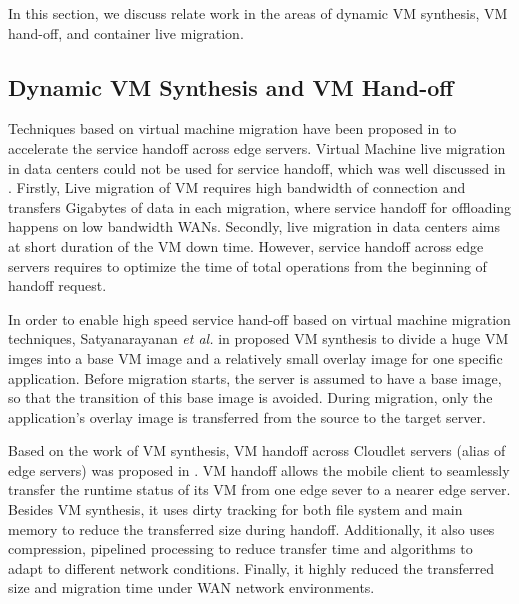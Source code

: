 In this section, we discuss relate work in the areas of dynamic VM synthesis, VM hand-off, and container live migration.

\subsection{Dynamic VM Synthesis and VM Hand-off} \label{motivation:vmhandoff}

Techniques based on virtual machine migration have been proposed in  \cite{ha2015vmhandoff} \cite{satya2009case} to accelerate the service handoff across edge servers. Virtual Machine live migration in data centers could not be used for service handoff, which was well discussed in \cite{ha2015vmhandoff}. Firstly, Live migration of VM requires high bandwidth of connection and transfers Gigabytes of data in each migration, where service handoff for offloading happens on low bandwidth WANs. Secondly, live migration in data centers aims at short duration of the VM down time. However, service handoff across edge servers requires to optimize the time of total operations from the beginning of handoff request. 

In order to enable high speed service hand-off based on virtual machine migration techniques, Satyanarayanan \textit{et al.} in \cite{satya2009case} proposed VM synthesis to divide a huge VM imges into a base VM image and a relatively small overlay image for one specific application. Before migration starts, the server is assumed to have a base image, so that the transition of this base image is avoided. During migration, only the application's overlay image is transferred from the source to the target server.

Based on the work of VM synthesis, VM handoff across Cloudlet servers (alias of edge servers) was proposed in \cite{ha2015vmhandoff}. VM handoff allows the mobile client to seamlessly transfer the runtime status of its VM from one edge sever to a nearer edge server. Besides VM synthesis, it uses dirty tracking for both file system and main memory  to reduce the transferred size during handoff.
Additionally, it also uses compression, pipelined processing to reduce transfer time and algorithms to adapt to different network conditions.
Finally, it highly reduced the transferred size and migration time under WAN network environments.


